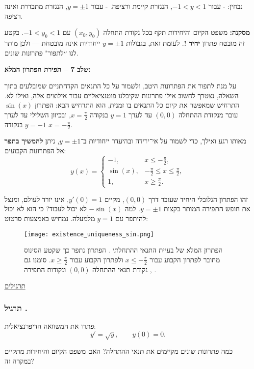 \documentclass{article}
\numberwithin{equation}{section}
\newcounter{exercise}[section]
\renewcommand{\theexercise}{\thesection.\arabic{exercise}}
\newcommand{\exercise}[1][]{%
  \refstepcounter{exercise}%
  \subsubsection*{תרגיל \theexercise\; #1}%
  \label{ex:\theexercise}%
}
\begin{document}
נבחין:
- עבור $-1<y<1$, הנגזרת קיימת ורציפה.  
- עבור $y=\pm 1$, הנגזרת מתבדרת ואינה רציפה.  

\textbf{מסקנה:}  
משפט הקיום והיחידות תקף בכל נקודת התחלה $(x_0,y_0)$ עם $-1<y_0<1$.  
בקטע זה מובטח פתרון \textbf{יחיד !}.  
לעומת זאת, בגבולות $y=\pm 1$ ייחודיות אינה מובטחת — ולכן מותר לנו ׳׳לתפור" פתרונות שונים.

\textbf{שלב 7 – תפירת הפתרון המלא:}  

על מנת לתפור את הפתרונות היטב, ולשמור על כל התנאים הקדחתניים שמובלעים בתוך השאלה, נצטרך לחשוב אילו פתרונות שקיבלנו פוטנציאליים עבור אילוצים אלה, ואילו לא. התרחיש שמאפשר את קיום כל התנאים בו זמנית, הוא התרחיש הבא:
הפתרון $\sin(x)$ עובר מנקודת ההתחלה $(0,0)$ עד לערך $y=1$ בנקודה $x=\tfrac{\pi}{2}$, ובכיוון השלילי עד לערך $y=-1$ בנקודה $x=-\tfrac{\pi}{2}$.  

מאותו רגע ואילך, כדי לשמור על אי־ירידה ובהיעדר ייחודיות ב־$y=\pm 1$, ניתן \textbf{להמשיך בתפר} אל הפתרונות הקבועים:  
\[
\boxed{
y(x) = 
\begin{cases}
-1, & x \leq -\tfrac{\pi}{2}, \\[6pt]
\sin(x), & -\tfrac{\pi}{2}\leq x \leq \tfrac{\pi}{2}, \\[6pt]
1, & x \geq \tfrac{\pi}{2}.
\end{cases}
}
\]

זהו הפתרון הגלובלי היחיד שעובר דרך $(0,0)$, מקיים $y'(0)=1$, אינו יורד לעולם, ומנצל את חופש התפירה המותר בקצות $y=\pm 1$. למה $-\sin(x)$ לא יכול לעבוד? כי הוא לא יכול להיתפר עם $y=1$ מלמעלה. נמחיש באמצעות סרטוט:
\begin{figure}[H]
    \centering
    \texttt{[image: existence\_uniqueness\_sin.png]}
    \caption{הפתרון המלא של בעיית התנאי ההתחלתי 
    . 
    הפתרון נתפר כך שקטע הסינוס 
    מחובר לפתרון הקבוע 
    עבור $x\leq -\frac{\pi}{2}$ 
    ולפתרון הקבוע 
    עבור $x\geq \frac{\pi}{2}$. 
    סומנו גם נקודת תנאי ההתחלה $(0,0)$ ונקודות התפירה 
    , .}
    \label{fig:existence_uniqueness_sin}
\end{figure}

\newpage
\underline{תרגילים}
\exercise{}

פתרו את המשוואה הדיפרנציאלית:
\[
y' = \sqrt{y}, 
\qquad y(0)=0.
\]

כמה פתרונות שונים מקיימים את תנאי ההתחלה?  
האם משפט הקיום והיחידות מתקיים במקרה זה?
\end{document}
